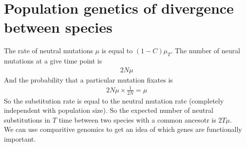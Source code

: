 \documentclass{article}
\begin{document}
    \section{Population genetics of divergence between species}
        The rate of neutral mutations $\mu$ is equal to $(1 - C)\mu_T$.  The number of neural mutations at a give time point is
        \begin{align}
            2N\mu
        \end{align}
        And the probability that a particular mutation fixates is
        \begin{align}
            2N\mu \times\frac{1}{2N} = \mu
        \end{align}
        So the substitution rate is equal to the neutral mutation rate (completely independent with population size).  So the expected number of neutral substitutions in $T$ time between two species with a common ancesotr is $2T\mu$. \\

        We can use comparitive genomics to get an idea of which genes are functionally important.
\end{document}
